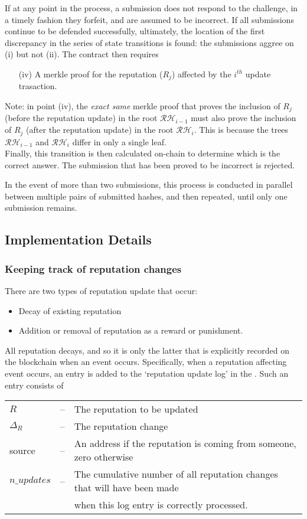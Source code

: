 If at any point in the process, a submission does not respond to the challenge, in a timely fashion they forfeit, and are assumed to be incorrect. If all submissions continue to be defended successfully, ultimately, the location of the first discrepancy in the series of state transitions is found: the submissions aggree on (i) but not (ii). The contract then requires
\begin{itemize}
 \item[(iv)] A merkle proof for the reputation ($R_j$) affected by the $i^{th}$ update trasaction.
\end{itemize}
Note: in point (iv), the \emph{exact same} merkle proof that proves the inclusion of $R_j$ (before the reputation update) in the root $\mathcal{RH}_{i-1}$ must also prove the inclusion of $R_j$ (after the reputation update) in the root $\mathcal{RH}_i$. This is because the trees $\mathcal{RH}_{i-1}$ and $\mathcal{RH}_i$ differ in only a single leaf.\\

Finally, this transition is then calculated on-chain to determine which is the correct answer. The submission that has been proved to be incorrect is rejected.

In the event of more than two submissions, this process is conducted in parallel between multiple pairs of submitted hashes, and then repeated, until only one submission remains.




\subsection{Implementation Details}
%
\subsubsection{Keeping track of reputation changes}
%
There are two types of reputation update that occur:
\begin{itemize}
 \item Decay of existing reputation
 \item Addition or removal of reputation as a reward or punishment.
\end{itemize}
All reputation decays, and so it is only the latter that is explicitly recorded on the blockchain when an event occurs. Specifically, when a reputation affecting event occurs, an entry is added to the `reputation update log' in the \rc. Such an entry consists of
\begin{center}
\begin{tabular}{lll}
$R$ &--& The reputation to be updated\\
$\Delta_R$ &--& The reputation change\\
source &--& An address if the reputation is coming from someone, zero otherwise\\
$n\_updates$ &--& The cumulative number of all reputation changes that will have been made\\
	    & & when this log entry is correctly processed.\\
\end{tabular}
\end{center}

